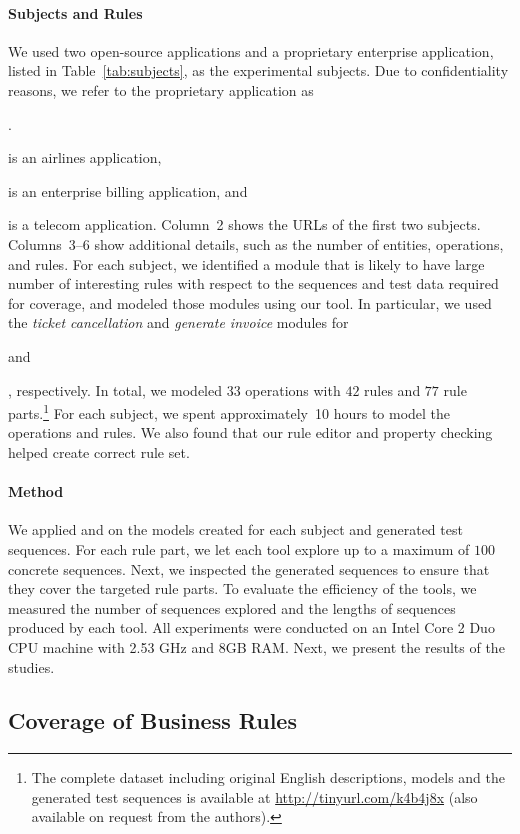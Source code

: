 \paragraph*{Subjects and Rules} We used two open-source applications and a proprietary enterprise application,
listed in Table~\ref{tab:subjects}, as the experimental subjects. Due to
confidentiality reasons, we refer to the proprietary application as
\subject{App}. \subject{Cebu-pacific} is an airlines application,
\subject{jBilling} is an enterprise billing application, and \subject{App} is a
telecom application. Column~2 shows the URLs of the first two subjects.
Columns~3--6 show additional details, such as the number of entities,
operations, and rules. For each subject, we identified a module that is likely
to have large number of interesting rules with respect to the sequences and test
data required for coverage, and modeled those modules using our tool. In
particular, we used the \textit{ticket cancellation} and \textit{generate
  invoice} modules for \subject{Cebu-pacific} and \subject{jBilling},
respectively. In total, we modeled $33$ operations with $42$ rules and $77$ rule
parts.\footnote{\small The complete dataset including original English descriptions, models and the
  generated test sequences is available at \url{http://tinyurl.com/k4b4j8x}
  (also available on request from the authors).} For each subject, we spent
approximately~10 hours to model the operations and rules. We also found that
our rule editor and property checking helped create correct rule set.

\paragraph*{Method} We applied \tool{} and \exhaust{} on the models created for each subject and
generated test sequences. For each rule part, we let each tool explore up to a
maximum of $100$ concrete sequences. Next, we inspected the generated sequences
to ensure that they cover the targeted rule parts. To evaluate the efficiency of
the tools, we measured the number of sequences explored and the lengths of
sequences produced by each tool.  All experiments were conducted on an Intel
Core 2 Duo CPU machine with 2.53 GHz and 8GB RAM. Next, we present the results
of the studies.

\subsection{Coverage of Business Rules}

